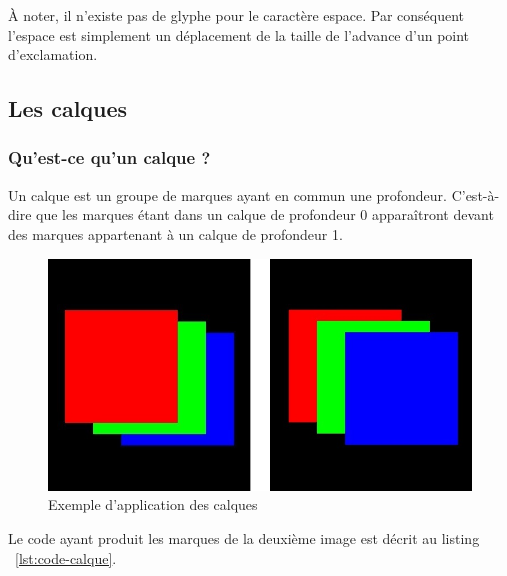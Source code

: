\documentclass[12pt]{article}
\begin{document}
À noter, il n'existe pas de glyphe pour le caractère espace. Par conséquent l'espace est simplement un déplacement de la taille de l'advance d'un point d'exclamation.

\subsection{Les calques}
\subsubsection{Qu'est-ce qu'un calque ?}
Un calque est un groupe de marques ayant en commun une profondeur. C'est-à-dire que les marques étant dans
un calque de profondeur 0 apparaîtront devant des marques appartenant à un calque de profondeur 1.

\begin{figure}[htp]
  \centering
  \includegraphics[scale=0.8]{images/calque-exemple}
  \caption{Exemple d'application des calques}
  \label{fig:calque-ex}
\end{figure}

Le code ayant produit les marques de la deuxième image est décrit au listing ~\ref{lst:code-calque}.
\end{document}
